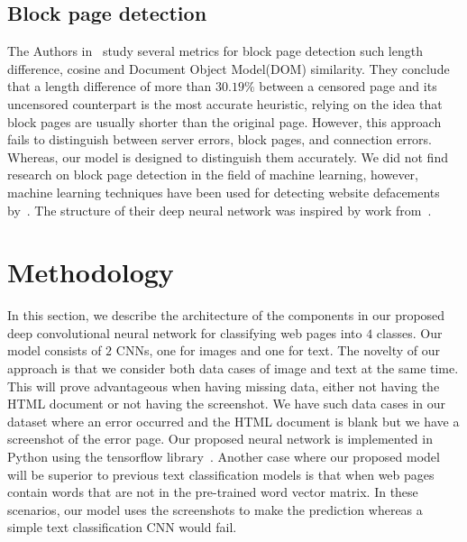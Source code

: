 \documentclass{article} %
\begin{document}
\subsection{Block page detection}
The Authors in~\parencite{imc14_phillipa} study several metrics for block page detection such length difference, cosine and Document Object Model(DOM) similarity. They conclude that a length difference of more than $30.19\%$ between a censored page and its uncensored counterpart is the most accurate heuristic, relying on the idea that block pages are usually shorter than the original page. However, this approach fails to distinguish between server errors, block pages, and connection errors. Whereas, our model is designed to distinguish them accurately.
We did not find research on block page detection in the field of machine learning, however, machine learning techniques have been used for detecting website defacements by~\cite{meerkat}. The structure of their deep neural network was inspired by work from~\cite{imagehinton,nipsandrewng,icml_unsupervised}.

\section{Methodology}
In this section, we describe the architecture of the components in our proposed deep convolutional neural network for classifying web pages into $4$ classes. Our model consists of $2$ CNNs, one for images and one for text. The novelty of our approach is that we consider both data cases of image and text at the same time. This will prove advantageous when having missing data, either not having the HTML document or not having the screenshot. We have such data cases in our dataset where an error occurred and the HTML document is blank but we have a screenshot of the error page. Our proposed neural network is implemented in Python using the tensorflow library~\cite{tensorflow2015}. Another case where our proposed model will be superior to previous text classification models is that when web pages contain words that are not in the pre-trained word vector matrix. In these scenarios, our model uses the screenshots to make the prediction whereas a simple text classification CNN would fail.
\end{document}
